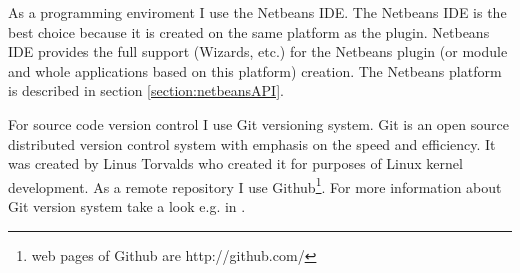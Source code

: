 As a programming enviroment I use the Netbeans IDE. The Netbeans IDE is the best choice because it is created on the same platform as the plugin. Netbeans IDE provides the full support (Wizards, etc.) for the Netbeans plugin (or module and whole applications based on this platform) creation. The Netbeans platform is described in section \ref{section:netbeansAPI}.

For source code version control I use Git versioning system. Git is an open source distributed version control system with emphasis on the speed and efficiency. It was created by Linus Torvalds who created it for purposes of Linux kernel development. As a remote repository I use Github\footnote{web pages of Github are http://github.com/}. For more information about Git version system take a look e.g. in \cite{GitWeb}.
